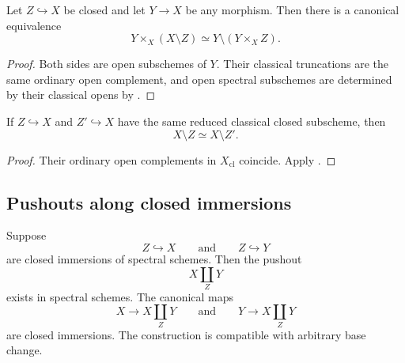 \begin{proposition}
\label{prop:complement-base-change}
Let $Z\hookrightarrow X$ be closed and let $Y\to X$ be any morphism. Then
there is a canonical equivalence
\[
    Y\times_X(X\setminus Z)
    \simeq
    Y\setminus(Y\times_XZ).
\]
\end{proposition}

\begin{proof}
Both sides are open subschemes of $Y$. Their classical truncations are the
same ordinary open complement, and open spectral subschemes are determined
by their classical opens by .
\end{proof}

\begin{corollary}
\label{cor:complement-reduced-closed-part}
If $Z\hookrightarrow X$ and $Z'\hookrightarrow X$ have the same reduced
classical closed subscheme, then
\[
    X\setminus Z
    \simeq
    X\setminus Z'.
\]
\end{corollary}

\begin{proof}
Their ordinary open complements in $X_{\mathrm{cl}}$ coincide. Apply
.
\end{proof}

\subsection{Pushouts along closed immersions}

\begin{theorem}
\label{thm:closed-pushouts-spectral-schemes}
Suppose
\[
    Z
    \hookrightarrow
    X
    \qquad\text{and}\qquad
    Z
    \hookrightarrow
    Y
\]
are closed immersions of spectral schemes. Then the pushout
\[
    X\coprod_ZY
\]
exists in spectral schemes. The canonical maps
\[
    X
    \longrightarrow
    X\coprod_ZY
    \qquad\text{and}\qquad
    Y
    \longrightarrow
    X\coprod_ZY
\]
are closed immersions. The construction is compatible with arbitrary
base change.
\end{theorem}

